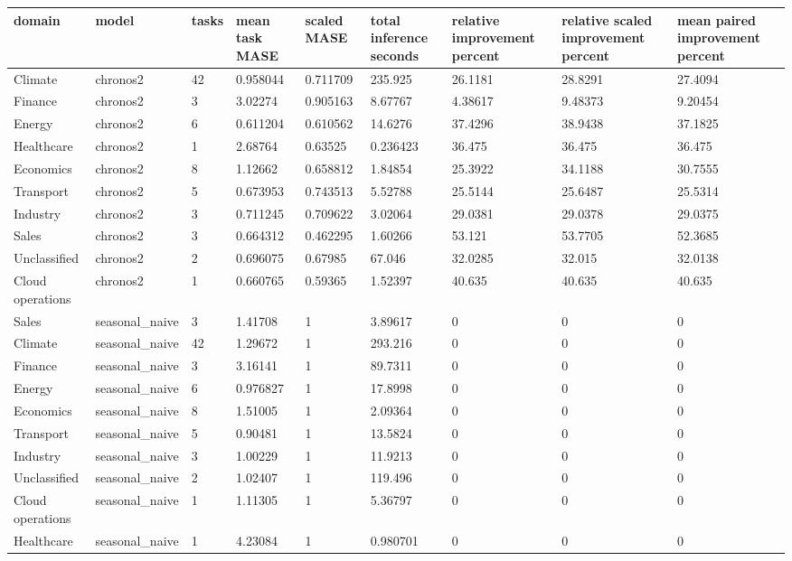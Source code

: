 \begin{tabular}{lllllllll}
\toprule
domain & model & tasks & mean task MASE & scaled MASE & total inference seconds & relative improvement percent & relative scaled improvement percent & mean paired improvement percent \\
\midrule
Climate & chronos2 & 42 & 0.958044 & 0.711709 & 235.925 & 26.1181 & 28.8291 & 27.4094 \\
Finance & chronos2 & 3 & 3.02274 & 0.905163 & 8.67767 & 4.38617 & 9.48373 & 9.20454 \\
Energy & chronos2 & 6 & 0.611204 & 0.610562 & 14.6276 & 37.4296 & 38.9438 & 37.1825 \\
Healthcare & chronos2 & 1 & 2.68764 & 0.63525 & 0.236423 & 36.475 & 36.475 & 36.475 \\
Economics & chronos2 & 8 & 1.12662 & 0.658812 & 1.84854 & 25.3922 & 34.1188 & 30.7555 \\
Transport & chronos2 & 5 & 0.673953 & 0.743513 & 5.52788 & 25.5144 & 25.6487 & 25.5314 \\
Industry & chronos2 & 3 & 0.711245 & 0.709622 & 3.02064 & 29.0381 & 29.0378 & 29.0375 \\
Sales & chronos2 & 3 & 0.664312 & 0.462295 & 1.60266 & 53.121 & 53.7705 & 52.3685 \\
Unclassified & chronos2 & 2 & 0.696075 & 0.67985 & 67.046 & 32.0285 & 32.015 & 32.0138 \\
Cloud operations & chronos2 & 1 & 0.660765 & 0.59365 & 1.52397 & 40.635 & 40.635 & 40.635 \\
Sales & seasonal\_naive & 3 & 1.41708 & 1 & 3.89617 & 0 & 0 & 0 \\
Climate & seasonal\_naive & 42 & 1.29672 & 1 & 293.216 & 0 & 0 & 0 \\
Finance & seasonal\_naive & 3 & 3.16141 & 1 & 89.7311 & 0 & 0 & 0 \\
Energy & seasonal\_naive & 6 & 0.976827 & 1 & 17.8998 & 0 & 0 & 0 \\
Economics & seasonal\_naive & 8 & 1.51005 & 1 & 2.09364 & 0 & 0 & 0 \\
Transport & seasonal\_naive & 5 & 0.90481 & 1 & 13.5824 & 0 & 0 & 0 \\
Industry & seasonal\_naive & 3 & 1.00229 & 1 & 11.9213 & 0 & 0 & 0 \\
Unclassified & seasonal\_naive & 2 & 1.02407 & 1 & 119.496 & 0 & 0 & 0 \\
Cloud operations & seasonal\_naive & 1 & 1.11305 & 1 & 5.36797 & 0 & 0 & 0 \\
Healthcare & seasonal\_naive & 1 & 4.23084 & 1 & 0.980701 & 0 & 0 & 0 \\
\bottomrule
\end{tabular}
